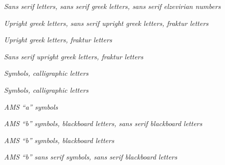 \documentclass[12pt,a4paper]{article}
\begin{document}
\bigskip
\begin{center}
\textit{Sans serif letters, sans serif greek letters, sans serif elzevirian numbers}
\end{center}
\vfill\clearpage

\bigskip
\begin{center}
\textit{Upright greek letters, sans serif  upright greek letters, fraktur letters}
\end{center}
\vfill\clearpage

\bigskip
\begin{center}
\textit{Upright greek letters, fraktur letters}
\end{center}
\vfill\clearpage

\bigskip
\begin{center}
\textit{Sans serif upright greek letters, fraktur letters}
\end{center}
\vfill\clearpage 

\bigskip
\begin{center}
\textit{Symbols, calligraphic letters}
\end{center}
\vfill\clearpage

\bigskip
\begin{center}
\textit{Symbols, calligraphic letters}
\end{center}
\vfill\clearpage

\bigskip
\begin{center}
\textit{AMS ``a'' symbols}
\end{center}
\vfill\clearpage

\bigskip
\begin{center}
\textit{AMS ``b'' symbols, blackboard letters, sans serif blackboard letters}
\end{center}
\vfill\clearpage

\bigskip
\begin{center}
\textit{AMS ``b'' symbols, blackboard letters}
\end{center}
\vfill\clearpage

\bigskip
\begin{center}
\textit{AMS ``b'' sans serif symbols, sans serif blackboard letters}
\end{center}
\vfill\clearpage 
\end{document}
